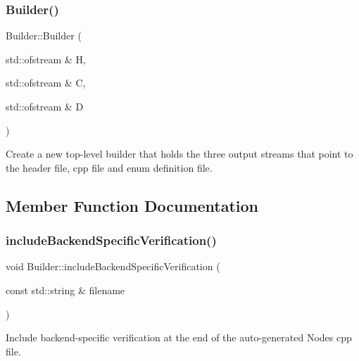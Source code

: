 \subsubsection{\texorpdfstring{Builder()}{Builder()}\hspace{0.1cm}{\footnotesize\ttfamily [2/2]}}
{\footnotesize\ttfamily Builder\+::\+Builder (\begin{DoxyParamCaption}\item[{std\+::ofstream \&}]{H,  }\item[{std\+::ofstream \&}]{C,  }\item[{std\+::ofstream \&}]{D }\end{DoxyParamCaption})\hspace{0.3cm}{\ttfamily [inline]}}

Create a new top-\/level builder that holds the three output streams that point to the header file, cpp file and enum definition file. 

\subsection{Member Function Documentation}
\mbox{\label{class_builder_ab3a71329b155fa1c5f1a032cc0a99ada}} 
\subsubsection{\texorpdfstring{include\+Backend\+Specific\+Verification()}{includeBackendSpecificVerification()}\hspace{0.1cm}{\footnotesize\ttfamily [1/2]}}
{\footnotesize\ttfamily void Builder\+::include\+Backend\+Specific\+Verification (\begin{DoxyParamCaption}\item[{const std\+::string \&}]{filename }\end{DoxyParamCaption})\hspace{0.3cm}{\ttfamily [inline]}}

Include backend-\/specific verification at the end of the auto-\/generated Nodes cpp file. \mbox{\label{class_builder_ab3a71329b155fa1c5f1a032cc0a99ada}} 

